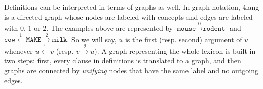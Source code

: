 \documentclass[a4paper,10pt]{article}
\begin{document}
Definitions can be interpreted in terms of graphs as well. In graph notation, 4lang is a directed graph whose nodes are labeled with concepts and edges are labeled with $0$, $1$ or $2$. The examples above are represented by $\texttt{mouse}\xrightarrow{0}\texttt{rodent}$ and $\texttt{cow}\xleftarrow{1}\texttt{MAKE}\xrightarrow{2}\texttt{milk}$. So we will say, $u$ is the first (resp. second) argument of $v$ whenever $u\xleftarrow{1}v$ (resp. $v\xrightarrow 2 u$).
A graph representing the whole lexicon is built in two steps: first, every clause in definitions is translated to a graph, and then graphs are connected by \emph{unifying} nodes that have the same label and no outgoing edges.

\end{document}
